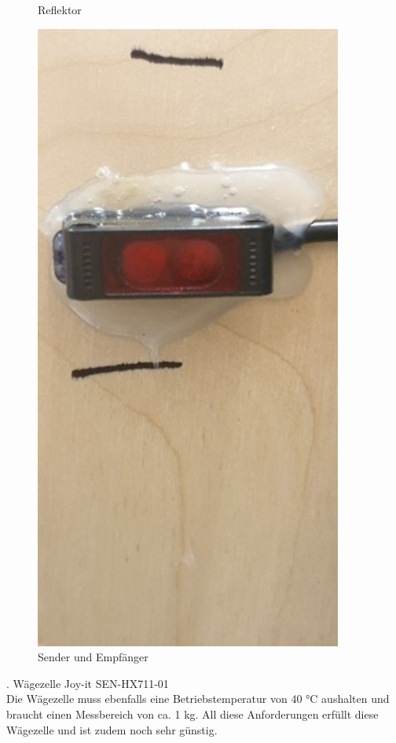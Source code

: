\documentclass[10pt,a4paper]{report}
\begin{document}
\begin{figure}
\begin{minipage}[b]{.4\linewidth}
			\centering
			\caption{Reflektor}
		\end{minipage}
		\hspace{.1\linewidth}
		\begin{minipage}[b]{.4\linewidth}
			\includegraphics[width=0.9\textwidth]{Lichtschranke 2}
			\centering
			\caption{Sender und Empfänger}
		\end{minipage}
	\end{figure}
	. Wägezelle Joy-it SEN-HX711-01 \\
	Die Wägezelle muss ebenfalls eine Betriebstemperatur von 40 °C aushalten und braucht einen Messbereich von ca. 1 kg. All diese Anforderungen erfüllt diese Wägezelle und ist zudem noch sehr günstig.\\
	
\end{document}
